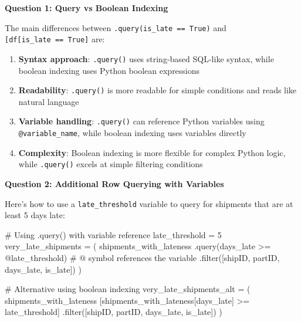 \documentclass[
  letterpaper,
  DIV=11,
  numbers=noendperiod]{scrartcl}
\newenvironment{Shaded}{\begin{snugshade}}{\end{snugshade}}
\newcommand{\BuiltInTok}[1]{\textcolor[rgb]{0.00,0.23,0.31}{#1}}
\newcommand{\CommentTok}[1]{\textcolor[rgb]{0.37,0.37,0.37}{#1}}
\newcommand{\DecValTok}[1]{\textcolor[rgb]{0.68,0.00,0.00}{#1}}
\newcommand{\NormalTok}[1]{\textcolor[rgb]{0.00,0.23,0.31}{#1}}
\newcommand{\OperatorTok}[1]{\textcolor[rgb]{0.37,0.37,0.37}{#1}}
\newcommand{\StringTok}[1]{\textcolor[rgb]{0.13,0.47,0.30}{#1}}
\providecommand{\tightlist}{%
  \setlength{\itemsep}{0pt}\setlength{\parskip}{0pt}}
\begin{document}
\textbf{Question 1: Query vs Boolean Indexing}

The main differences between
\texttt{.query(\textquotesingle{}is\_late\ ==\ True\textquotesingle{})}
and
\texttt{{[}df{[}\textquotesingle{}is\_late\textquotesingle{}{]}\ ==\ True{]}}
are:

\begin{enumerate}
\def\labelenumi{\arabic{enumi}.}
\tightlist
\item
  \textbf{Syntax approach}: \texttt{.query()} uses string-based SQL-like
  syntax, while boolean indexing uses Python boolean expressions
\item
  \textbf{Readability}: \texttt{.query()} is more readable for simple
  conditions and reads like natural language
\item
  \textbf{Variable handling}: \texttt{.query()} can reference Python
  variables using \texttt{@variable\_name}, while boolean indexing uses
  variables directly
\item
  \textbf{Complexity}: Boolean indexing is more flexible for complex
  Python logic, while \texttt{.query()} excels at simple filtering
  conditions
\end{enumerate}

\textbf{Question 2: Additional Row Querying with Variables}

Here's how to use a \texttt{late\_threshold} variable to query for
shipments that are at least 5 days late:

\begin{Shaded}
\begin{Highlighting}[]
\CommentTok{\# Using .query() with variable reference}
\NormalTok{late\_threshold }\OperatorTok{=} \DecValTok{5}
\NormalTok{very\_late\_shipments }\OperatorTok{=}\NormalTok{ (}
\NormalTok{    shipments\_with\_lateness}
\NormalTok{    .query(}\StringTok{\textquotesingle{}days\_late \textgreater{}= @late\_threshold\textquotesingle{}}\NormalTok{)  }\CommentTok{\# @ symbol references the variable}
\NormalTok{    .}\BuiltInTok{filter}\NormalTok{([}\StringTok{\textquotesingle{}shipID\textquotesingle{}}\NormalTok{, }\StringTok{\textquotesingle{}partID\textquotesingle{}}\NormalTok{, }\StringTok{\textquotesingle{}days\_late\textquotesingle{}}\NormalTok{, }\StringTok{\textquotesingle{}is\_late\textquotesingle{}}\NormalTok{])}
\NormalTok{)}

\CommentTok{\# Alternative using boolean indexing}
\NormalTok{very\_late\_shipments\_alt }\OperatorTok{=}\NormalTok{ (}
\NormalTok{    shipments\_with\_lateness}
\NormalTok{    [shipments\_with\_lateness[}\StringTok{\textquotesingle{}days\_late\textquotesingle{}}\NormalTok{] }\OperatorTok{\textgreater{}=}\NormalTok{ late\_threshold]}
\NormalTok{    .}\BuiltInTok{filter}\NormalTok{([}\StringTok{\textquotesingle{}shipID\textquotesingle{}}\NormalTok{, }\StringTok{\textquotesingle{}partID\textquotesingle{}}\NormalTok{, }\StringTok{\textquotesingle{}days\_late\textquotesingle{}}\NormalTok{, }\StringTok{\textquotesingle{}is\_late\textquotesingle{}}\NormalTok{])}
\NormalTok{)}
\end{Highlighting}
\end{Shaded}
\end{document}
